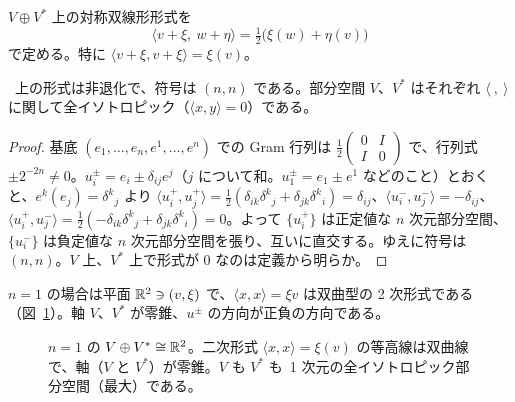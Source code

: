 \begin{defn}
$V\oplus V^*$ 上の対称双線形形式を
\[
\langle v+\xi,\ w+\eta\rangle=\tfrac12\bigl(\xi(w)+\eta(v)\bigr)
\]
で定める。特に $\langle v+\xi,v+\xi\rangle=\xi(v)$。
\end{defn}

\begin{prop}\label{A:prop:pairing}
\tP\ 上の形式は非退化で、符号は $(n,n)$ である。部分空間 $V$、$V^*$ はそれぞれ $\langle\ ,\ \rangle$ に関して全イソトロピック（$\langle x,y\rangle=0$）である。
\end{prop}
\begin{proof}
基底 $(e_1,\dots,e_n,e^1,\dots,e^n)$ での Gram 行列は $\frac12\begin{pmatrix}0&I\\ I&0\end{pmatrix}$ で、行列式 $\pm2^{-2n}\ne0$。$u_i^\pm=e_i\pm\delta_{ij}e^j$（$j$ について和。$u_1^\pm=e_1\pm e^1$ などのこと）とおくと、$e^k(e_j)=\delta^k{}_j$ より
$\langle u_i^+,u_j^+\rangle=\frac12(\delta_{ik}\delta^k{}_j+\delta_{jk}\delta^k{}_i)=\delta_{ij}$、$\langle u_i^-,u_j^-\rangle=-\delta_{ij}$、$\langle u_i^+,u_j^-\rangle=\frac12(-\delta_{ik}\delta^k{}_j+\delta_{jk}\delta^k{}_i)=0$。よって $\{u_i^+\}$ は正定値な $n$ 次元部分空間、$\{u_i^-\}$ は負定値な $n$ 次元部分空間を張り、互いに直交する。ゆえに符号は $(n,n)$。$V$ 上、$V^*$ 上で形式が $0$ なのは定義から明らか。
\end{proof}

$n=1$ の場合は平面 $\mathbb R^2\ni(v,\xi)$ で、$\langle x,x\rangle=\xi v$ は双曲型の 2 次形式である（図~\ref{A:fig:hyper}）。軸 $V$、$V^*$ が零錐、$u^\pm$ の方向が正負の方向である。

\begin{figure}[htbp]
\centering
{}
\caption{$n=1$ の $V\oplus V^*\cong\mathbb R^2$。二次形式 $\langle x,x\rangle=\xi(v)$ の等高線は双曲線で、軸（$V$ と $V^*$）が零錐。$V$ も $V^*$ も\ 1 次元の全イソトロピック部分空間（最大）である。\label{A:fig:hyper}}
\end{figure}

